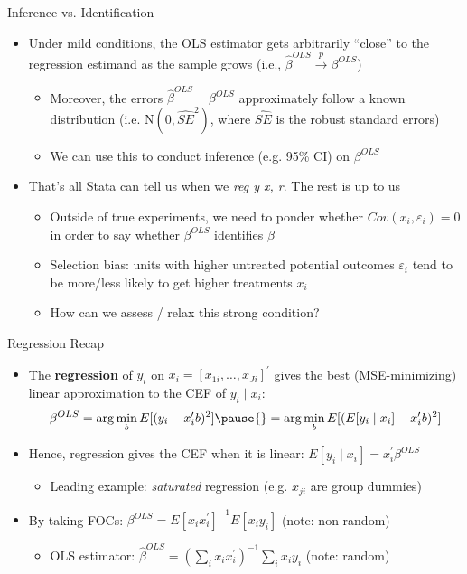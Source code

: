 \documentclass[11pt,english]{beamer}
\begin{document}
\begin{frame}{Inference vs. Identification}
\begin{itemize}
\item Under mild conditions, the OLS estimator gets arbitrarily ``close'' to the regression estimand as the sample grows (i.e., $\hat{\beta}^{OLS}\xrightarrow{p}\beta^{OLS}$)\smallskip
\begin{itemize}
\item Moreover, the errors $\hat\beta^{OLS}-\beta^{OLS}$ approximately follow a known distribution (i.e. $\mathrm{N}(0,\hat{SE}^2)$, where $\hat{SE}$ is the robust standard errors)\smallskip
\item We can use this to conduct inference (e.g. 95\% CI) on $\beta^{OLS}$
\end{itemize}\bigskip\pause{}
\item That's all Stata can tell us when we \emph{reg y x, r}. The rest is up to us\smallskip
\begin{itemize}
\item Outside of true experiments, we need to ponder whether $Cov(x_i,\varepsilon_i)=0$ in order to say whether $\beta^{OLS}$ identifies $\beta$\smallskip\pause{}
\item Selection bias: units with higher untreated potential outcomes $\varepsilon_i$ tend to be more/less likely to get higher treatments $x_i$\smallskip\pause{}
\item How can we assess / relax this strong condition? 
\end{itemize}
\end{itemize}
\end{frame}

\begin{frame}{Regression Recap}
\begin{itemize}
\item The \textbf{regression} of $y_i$ on $x_i=[x_{1i},\dots,x_{Ji}]^\prime$ gives the best (MSE-minimizing) linear approximation to the CEF of $y_i\mid x_i$:\pause{}
\begin{align*}
\beta^{OLS} = \arg\min_b E[(y_i-x_i'b)^2]\pause{} =\arg\min_b E[(E[y_i\mid x_i]-x_i'b)^2]
\end{align*}\pause{}\vspace{-0.25cm}
\item Hence, regression gives the CEF when it is linear: $E[y_i\mid x_i]=x_i^\prime\beta^{OLS}$\smallskip
\begin{itemize}
\item Leading example: \pause{}\emph{saturated} regression (e.g. $x_{ji}$ are group dummies)
\end{itemize}\bigskip\pause{}
\item By taking FOCs: $\beta^{OLS}=E[x_ix_i^\prime]^{-1}E[x_iy_i]$ (note: non-random)
\begin{itemize}
\item OLS estimator: $\hat\beta^{OLS}=(\sum_i x_ix_i^\prime)^{-1}\sum_i x_iy_i$ (note: random)
\end{itemize}
\end{itemize}
\end{frame}
\end{document}
